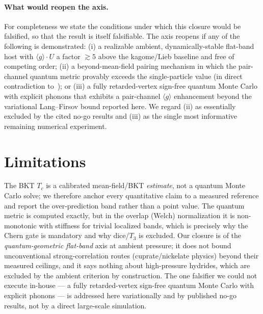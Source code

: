 \documentclass[11pt,a4paper]{article}
\newcommand{\qgg}{\langle g \rangle}
\begin{document}
\paragraph{What would reopen the axis.}
For completeness we state the conditions under which this closure would be falsified, so that the
result is itself falsifiable. The axis reopens if any of the following is demonstrated: (i) a
realizable ambient, dynamically-stable flat-band host with $\qgg\!\cdot\!U$ a factor $\gtrsim 5$
above the kagome/Lieb baseline and free of competing order; (ii) a beyond-mean-field pairing
mechanism in which the pair-channel quantum metric provably exceeds the single-particle value (in
direct contradiction to~\citep{tam2024,herzog2022,nogo2026}); or (iii) a fully retarded-vertex
sign-free quantum Monte Carlo with explicit phonons that exhibits a pair-channel $\qgg$ enhancement
beyond the variational Lang--Firsov bound reported here. We regard (ii) as essentially excluded by
the cited no-go results and (iii) as the single most informative remaining numerical experiment.

\section{Limitations}
The BKT $T_c$ is a calibrated mean-field/BKT \emph{estimate}, not a quantum Monte Carlo solve; we
therefore anchor every quantitative claim to a measured reference and report the over-prediction
band rather than a point value. The quantum metric is computed exactly, but in the overlap (Welch)
normalization it is non-monotonic with stiffness for trivial localized bands, which is precisely why
the Chern gate is mandatory and why dice/$T_3$ is excluded. Our closure is of the
\emph{quantum-geometric flat-band} axis at ambient pressure; it does not bound unconventional
strong-correlation routes (cuprate/nickelate physics) beyond their measured ceilings, and it says
nothing about high-pressure hydrides, which are excluded by the ambient criterion by construction.
The one falsifier we could not execute in-house --- a fully retarded-vertex sign-free quantum Monte
Carlo with explicit phonons --- is addressed here variationally and by published no-go results, not
by a direct large-scale simulation.
\end{document}
